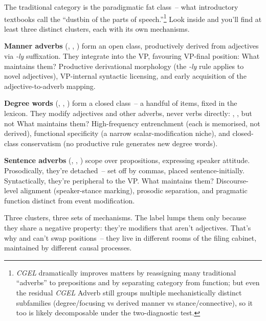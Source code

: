 The traditional category  is the paradigmatic fat class~-- what introductory textbooks call the \enquote{dustbin of the parts of speech.}\footnote{\textit{CGEL} dramatically improves matters by reassigning many traditional \enquote{adverbs} to prepositions and by separating category from function; but even the residual \textit{CGEL} Adverb still groups multiple mechanistically distinct subfamilies (degree/focusing vs derived manner vs stance/connective), so it too is likely decomposable under the two-diagnostic test.} Look inside and you'll find at least three distinct clusters, each with its own mechanisms.

\textbf{Manner adverbs} (, , ) form an open class, productively derived from adjectives via \textit{-ly} suffixation. They integrate into the VP, favouring VP-final position:  What maintains them? Productive derivational morphology (the \textit{-ly} rule applies to novel adjectives), VP-internal syntactic licensing, and early acquisition of the adjective-to-adverb mapping.

\textbf{Degree words} (, , ) form a closed class~-- a handful of items, fixed in the lexicon. They modify adjectives and other adverbs, never verbs directly: , , but not \ungram{} What maintains them? High-frequency entrenchment (each is memorised, not derived), functional specificity (a narrow scalar-modification niche), and closed-class conservatism (no productive rule generates new degree words).

\textbf{Sentence adverbs} (, , ) scope over propositions, expressing speaker attitude. Prosodically, they're detached~-- set off by commas, placed sentence-initially. Syntactically, they're peripheral to the VP. What maintains them? Discourse-level alignment (speaker-stance marking), prosodic separation, and pragmatic function distinct from event modification.

Three clusters, three sets of mechanisms. The label  lumps them only because they share a negative property: they're modifiers that aren't adjectives. That's why  and  can't swap positions~-- they live in different rooms of the filing cabinet, maintained by different causal processes.

